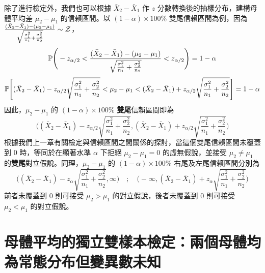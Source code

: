     除了進行檢定外，我們也可以根據 $\bar{X}_2 - \bar{X}_1$ 作 $z$ 分數轉換後的抽樣分布，建構母體平均差 $\mu_2 - \mu_1$ 的信賴區間。以 $(1-\alpha) \times 100\%$ 雙尾信賴區間為例，因為 $\frac{(\bar{X}_2-\bar{X}_1)-(\mu_2-\mu_1)}{\sqrt{\frac{\sigma_1^2}{n_1} + \frac{\sigma_2^2}{n_2}}} \sim \mathcal{Z}$，
    \smallskip
    \[\mathbb{P}\Bigg(-z_{\alpha/2} < \frac{(\bar{X}_2-\bar{X}_1)-(\mu_2-\mu_1)}{\sqrt{\frac{\sigma_1^2}{n_1} + \frac{\sigma_2^2}{n_2}}} < z_{\alpha/2}\Bigg) = 1-\alpha\]
    \[\mathbb{P}\Bigg[(\bar{X}_2-\bar{X}_1) - z_{\alpha/2} \sqrt{\frac{\sigma_1^2}{n_1} + \frac{\sigma_2^2}{n_2}} < \mu_2-\mu_1  < (\bar{X}_2-\bar{X}_1) + z_{\alpha/2} \sqrt{\frac{\sigma_1^2}{n_1} + \frac{\sigma_2^2}{n_2}}\Bigg] = 1-\alpha\]
    \smallskip
    因此，$\mu_2-\mu_1$ 的 $(1-\alpha) \times 100\%$ \textbf{雙尾}信賴區間即為
    \smallskip
    \[\Bigg((\bar{X}_2-\bar{X}_1) - z_{\alpha/2} \sqrt{\frac{\sigma_1^2}{n_1} + \frac{\sigma_2^2}{n_2}},  (\bar{X}_2-\bar{X}_1) + z_{\alpha/2} \sqrt{\frac{\sigma_1^2}{n_1} + \frac{\sigma_2^2}{n_2}}\Bigg)\]
    \smallskip
    根據我們上一章有關檢定與信賴區間之間關係的探討，當這個雙尾信賴區間未覆蓋到 $0$ 時，等同於在顯著水準 $\alpha$ 下拒絕 $\mu_2 - \mu_1 = 0$ 的虛無假說，並接受 $\mu_2 \ne \mu_1$ 的\textbf{雙尾}對立假說。同理，$\mu_2-\mu_1$ 的 $(1-\alpha) \times 100\%$ 右尾及左尾信賴區間分別為
    \smallskip
    \[\Bigg((\bar{X}_2-\bar{X}_1) - z_{\alpha} \sqrt{\frac{\sigma_1^2}{n_1} + \frac{\sigma_2^2}{n_2}}, \infty \Bigg) \quad ; \quad \Bigg(-\infty, (\bar{X}_2-\bar{X}_1) + z_{\alpha} \sqrt{\frac{\sigma_1^2}{n_1} + \frac{\sigma_2^2}{n_2}} \Bigg)\]
    \smallskip
    前者未覆蓋到 $0$ 則可接受 $\mu_2 > \mu_1$ 的對立假說，後者未覆蓋到 $0$ 則可接受 $\mu_2 < \mu_1$ 的對立假說。
    
\section{母體平均的獨立雙樣本檢定：兩個母體均為常態分布但變異數未知}

